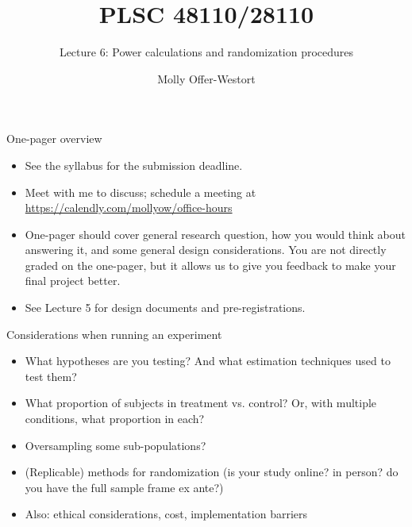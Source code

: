 \documentclass[xcolor={dvipsnames},handout]{beamer}
\title{PLSC 48110/28110}
\subtitle{Lecture 6: Power calculations and randomization procedures}
\date{}
\author{Molly Offer-Westort}
\institute{Department of Political Science, \\University of Chicago}
\begin{document}
\frame{\titlepage
\thispagestyle{empty}
}
\begin{frame}{One-pager overview}

\begin{itemize}
\item See the syllabus for the submission deadline.
\item Meet with me to discuss; schedule a meeting at \url{https://calendly.com/mollyow/office-hours}
\item One-pager should cover general research question, how you would think about answering it, and some general design considerations.  You are not directly graded on the one-pager, but it allows us to give you feedback to make your final project better.
\item See Lecture 5 for design documents and pre-registrations.
\end{itemize}

\end{frame}



\begin{frame}{Considerations when running an experiment}

\begin{itemize}
\item What hypotheses are you testing?  And what estimation techniques used to test them?
\item What proportion of subjects in treatment vs. control?  Or, with multiple conditions, what proportion in each?
\item Oversampling some sub-populations?
\item (Replicable) methods for randomization  (is your study online? in person? do you have the full sample frame ex ante?)
\item Also: ethical considerations, cost, implementation barriers
\end{itemize}

\end{frame}
\end{document}

